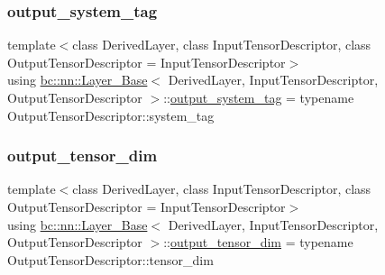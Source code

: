 \mbox{\label{structbc_1_1nn_1_1Layer__Base_a0a8227e1026be7581efc05cdc52fa052}} 
\subsubsection{\texorpdfstring{output\+\_\+system\+\_\+tag}{output\_system\_tag}}
{\footnotesize\ttfamily template$<$class Derived\+Layer, class Input\+Tensor\+Descriptor, class Output\+Tensor\+Descriptor = Input\+Tensor\+Descriptor$>$ \\
using \hyperlink{structbc_1_1nn_1_1Layer__Base}{bc\+::nn\+::\+Layer\+\_\+\+Base}$<$ Derived\+Layer, Input\+Tensor\+Descriptor, Output\+Tensor\+Descriptor $>$\+::\hyperlink{structbc_1_1nn_1_1Layer__Output__Base_ab95900f0cbd689cd1d2c187ac8d4ddd0}{output\+\_\+system\+\_\+tag} =  typename Output\+Tensor\+Descriptor\+::system\+\_\+tag}

\mbox{\label{structbc_1_1nn_1_1Layer__Base_ad855e04b19ef691641857a3e03f9c171}} 
\subsubsection{\texorpdfstring{output\+\_\+tensor\+\_\+dim}{output\_tensor\_dim}}
{\footnotesize\ttfamily template$<$class Derived\+Layer, class Input\+Tensor\+Descriptor, class Output\+Tensor\+Descriptor = Input\+Tensor\+Descriptor$>$ \\
using \hyperlink{structbc_1_1nn_1_1Layer__Base}{bc\+::nn\+::\+Layer\+\_\+\+Base}$<$ Derived\+Layer, Input\+Tensor\+Descriptor, Output\+Tensor\+Descriptor $>$\+::\hyperlink{structbc_1_1nn_1_1Layer__Output__Base_a52a461f65c3b8ae04ae445723a334e13}{output\+\_\+tensor\+\_\+dim} =  typename Output\+Tensor\+Descriptor\+::tensor\+\_\+dim}

\mbox{\label{structbc_1_1nn_1_1Layer__Base_a5e6970042ccdf89ae26040f527550314}} 
